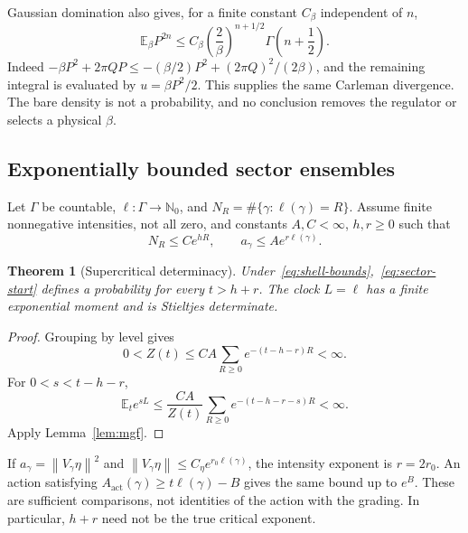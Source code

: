 \documentclass[11pt]{article}
\newtheorem{theorem}{Theorem}[section]
\theoremstyle{definition}
\newcommand{\N}{\mathbb N_0}
\newcommand{\E}{\mathbb E}
\newcommand{\norm}[1]{\left\lVert#1\right\rVert}
\begin{document}
Gaussian domination also gives, for a finite constant $C_\beta$ independent of $n$,
\begin{equation}
 \E_\beta P^{2n}\leq C_\beta
 \left(\frac{2}{\beta}\right)^{n+1/2}
 \Gamma\!\left(n+\frac12\right).
\end{equation}
Indeed $-\beta P^2+2\pi QP\leq-(\beta/2)P^2+(2\pi Q)^2/(2\beta)$, and the remaining integral is evaluated by $u=\beta P^2/2$.
This supplies the same Carleman divergence.
The bare density is not a probability, and no conclusion removes the regulator or selects a physical $\beta$.

\subsection{Exponentially bounded sector ensembles}

Let $\Gamma$ be countable, $\ell:\Gamma\to\N$, and
$N_R=\#\{\gamma:\ell(\gamma)=R\}$.
Assume finite nonnegative intensities, not all zero, and constants $A,C<\infty$, $h,r\geq0$ such that
\begin{equation}
 N_R\leq Ce^{hR},\qquad a_\gamma\leq Ae^{r\ell(\gamma)}.
 \label{eq:shell-bounds}
\end{equation}

\begin{theorem}[Supercritical determinacy]
\label{thm:supercritical}
Under~\eqref{eq:shell-bounds},~\eqref{eq:sector-start} defines a probability for every $t>h+r$.
The clock $L=\ell$ has a finite exponential moment and is Stieltjes determinate.
\end{theorem}
\begin{proof}
Grouping by level gives
\begin{equation}
 0<Z(t)\leq CA\sum_{R\geq0}e^{-(t-h-r)R}<\infty.
\end{equation}
For $0<s<t-h-r$,
\begin{equation}
 \E_t e^{sL}\leq\frac{CA}{Z(t)}
 \sum_{R\geq0}e^{-(t-h-r-s)R}<\infty.
\end{equation}
Apply Lemma~\ref{lem:mgf}.
\end{proof}

If $a_\gamma=\norm{V_\gamma\eta}^2$ and
$\norm{V_\gamma\eta}\leq C_\eta e^{r_0\ell(\gamma)}$, the intensity exponent is $r=2r_0$.
An action satisfying $A_{\mathrm{act}}(\gamma)\geq t\ell(\gamma)-B$ gives the same bound up to $e^B$.
These are sufficient comparisons, not identities of the action with the grading.
In particular, $h+r$ need not be the true critical exponent.
\end{document}
